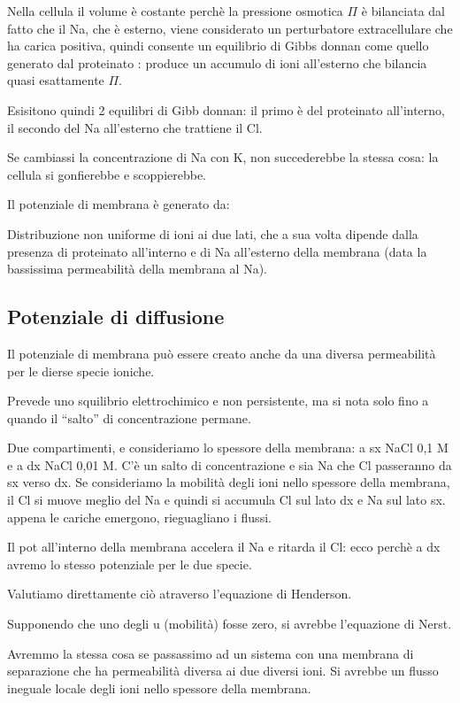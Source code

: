 \documentclass[a4paper,12pt]{article}
\begin{document}
Nella cellula il volume è costante perchè la pressione osmotica $\Pi$ è bilanciata dal fatto che il Na, che è esterno, viene considerato un perturbatore extracellulare che ha carica positiva, quindi consente un equilibrio di Gibbs donnan come quello generato dal proteinato : produce un accumulo di ioni all’esterno che bilancia quasi esattamente $\Pi$.

Esisitono quindi 2 equilibri di Gibb donnan: il primo è del proteinato all’interno, il secondo del Na all’esterno che trattiene il Cl.

Se cambiassi la concentrazione di Na con K, non succederebbe la stessa cosa: la cellula si gonfierebbe e scoppierebbe.

Il potenziale di membrana è generato da:

Distribuzione non uniforme di ioni ai due lati, che a sua volta dipende dalla presenza di proteinato all’interno e di Na all’esterno della membrana (data la bassissima permeabilità della membrana al Na).

\subsection{Potenziale di diffusione}

Il potenziale di membrana può essere creato anche da una diversa permeabilità per le dierse specie ioniche.

Prevede uno squilibrio elettrochimico e non  persistente, ma si nota solo fino a quando il “salto” di concentrazione permane.

Due compartimenti, e consideriamo lo spessore della membrana: a sx NaCl 0,1 M e a dx NaCl 0,01 M. C’è un salto di concentrazione e sia Na che Cl passeranno da sx verso dx. Se consideriamo la mobilità degli ioni nello spessore della membrana, il Cl si muove meglio del Na e quindi si accumula Cl sul lato dx e Na sul lato sx. appena le cariche emergono, rieguagliano i flussi.

Il pot all’interno della membrana accelera il Na e ritarda il Cl: ecco perchè a dx avremo lo stesso potenziale per le due specie.

Valutiamo direttamente ciò atraverso l’equazione di Henderson.

Supponendo che uno degli u (mobilità) fosse zero, si avrebbe l’equazione di Nerst.

Avremmo la stessa cosa se passassimo ad un sistema con una membrana di separazione che ha permeabilità diversa ai due diversi ioni. Si avrebbe un flusso ineguale locale degli ioni nello spessore della membrana.
\end{document}
